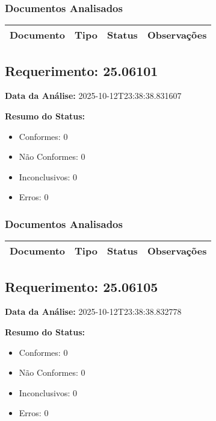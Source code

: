 \documentclass[12pt,a4paper]{article}
\begin{document}
\subsubsection{Documentos Analisados}

\begin{longtable}{|p{4cm}|p{2cm}|p{2cm}|p{6cm}|}
\hline
\textbf{Documento} & \textbf{Tipo} & \textbf{Status} & \textbf{Observações} \\
\hline
\endhead
\end{longtable}


\subsection{Requerimento: 25.06101}

\textbf{Data da Análise:} 2025-10-12T23:38:38.831607

\textbf{Resumo do Status:}
\begin{itemize}
    \item Conformes: 0
    \item Não Conformes: 0
    \item Inconclusivos: 0
    \item Erros: 0
\end{itemize}

\subsubsection{Documentos Analisados}

\begin{longtable}{|p{4cm}|p{2cm}|p{2cm}|p{6cm}|}
\hline
\textbf{Documento} & \textbf{Tipo} & \textbf{Status} & \textbf{Observações} \\
\hline
\endhead
\end{longtable}


\subsection{Requerimento: 25.06105}

\textbf{Data da Análise:} 2025-10-12T23:38:38.832778

\textbf{Resumo do Status:}
\begin{itemize}
    \item Conformes: 0
    \item Não Conformes: 0
    \item Inconclusivos: 0
    \item Erros: 0
\end{itemize}
\end{document}
